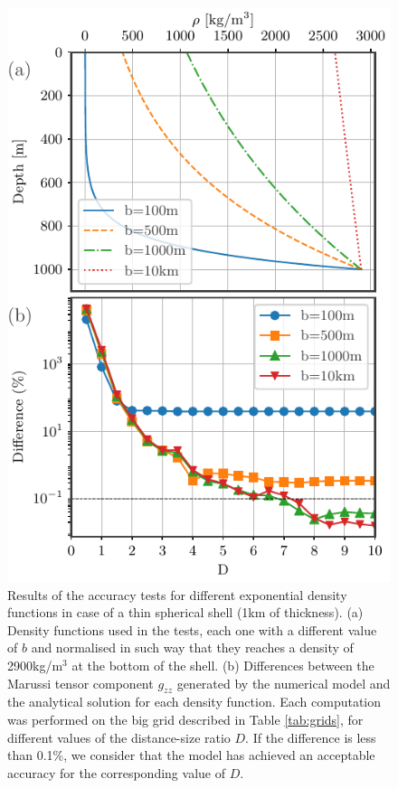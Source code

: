 \documentclass[extra]{gji}
\begin{document}
\begin{figure}
\centering
\includegraphics[width=0.9\linewidth]{figures/Dexp-power-differences-thin.pdf}
\caption{
    Results of the accuracy tests for different exponential density functions in case of a thin spherical shell (1km of thickness).
    (a) Density functions used in the tests, each one with a different value of $b$ and normalised in such way that they reaches a density of 2900kg/m$^{3}$ at the bottom of the shell.
    (b) Differences between the Marussi tensor component $g_{zz}$ generated by the numerical model and the analytical solution for each density function. Each computation was performed on the big grid described in Table \ref{tab:grids}, for different values of the distance-size ratio $D$. If the difference is less than 0.1\%, we consider that the model has achieved an acceptable accuracy for the corresponding value of $D$.
}
\label{fig:D-exp-power-thin}
\end{figure}
\end{document}
